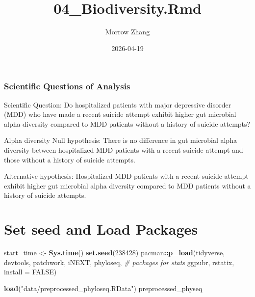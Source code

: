 \documentclass[
]{article}
\title{04\_Biodiversity.Rmd}
\author{Morrow Zhang}
\date{2026-04-19}
\newenvironment{Shaded}{\begin{snugshade}}{\end{snugshade}}
\newcommand{\AttributeTok}[1]{\textcolor[rgb]{0.13,0.29,0.53}{#1}}
\newcommand{\CommentTok}[1]{\textcolor[rgb]{0.56,0.35,0.01}{\textit{#1}}}
\newcommand{\ConstantTok}[1]{\textcolor[rgb]{0.56,0.35,0.01}{#1}}
\newcommand{\DecValTok}[1]{\textcolor[rgb]{0.00,0.00,0.81}{#1}}
\newcommand{\FunctionTok}[1]{\textcolor[rgb]{0.13,0.29,0.53}{\textbf{#1}}}
\newcommand{\NormalTok}[1]{#1}
\newcommand{\OtherTok}[1]{\textcolor[rgb]{0.56,0.35,0.01}{#1}}
\newcommand{\SpecialCharTok}[1]{\textcolor[rgb]{0.81,0.36,0.00}{\textbf{#1}}}
\newcommand{\StringTok}[1]{\textcolor[rgb]{0.31,0.60,0.02}{#1}}
\begin{document}
\maketitle

\hypertarget{scientific-questions-of-analysis}{%
\subsubsection{Scientific Questions of
Analysis}\label{scientific-questions-of-analysis}}

Scientific Question: Do hospitalized patients with major depressive
disorder (MDD) who have made a recent suicide attempt exhibit higher gut
microbial alpha diversity compared to MDD patients without a history of
suicide attempts?

Alpha diversity Null hypothesis: There is no difference in gut microbial
alpha diversity between hospitalized MDD patients with a recent suicide
attempt and those without a history of suicide attempts.

Alternative hypothesis: Hospitalized MDD patients with a recent suicide
attempt exhibit higher gut microbial alpha diversity compared to MDD
patients without a history of suicide attempts.

\hypertarget{set-seed-and-load-packages}{%
\section{Set seed and Load Packages}\label{set-seed-and-load-packages}}

\begin{Shaded}
\begin{Highlighting}[]
\NormalTok{start\_time }\OtherTok{\textless{}{-}} \FunctionTok{Sys.time}\NormalTok{()}
\FunctionTok{set.seed}\NormalTok{(}\DecValTok{238428}\NormalTok{)}
\NormalTok{pacman}\SpecialCharTok{::}\FunctionTok{p\_load}\NormalTok{(tidyverse, devtools, patchwork, iNEXT, phyloseq,}
               \CommentTok{\# packages for stats}
\NormalTok{               ggpubr, rstatix, }\AttributeTok{install =} \ConstantTok{FALSE}\NormalTok{)}
\end{Highlighting}
\end{Shaded}

\begin{Shaded}
\begin{Highlighting}[]
\FunctionTok{load}\NormalTok{(}\StringTok{"data/preprocessed\_phyloseq.RData"}\NormalTok{)}
\NormalTok{preprocessed\_physeq}
\end{Highlighting}
\end{Shaded}
\end{document}

